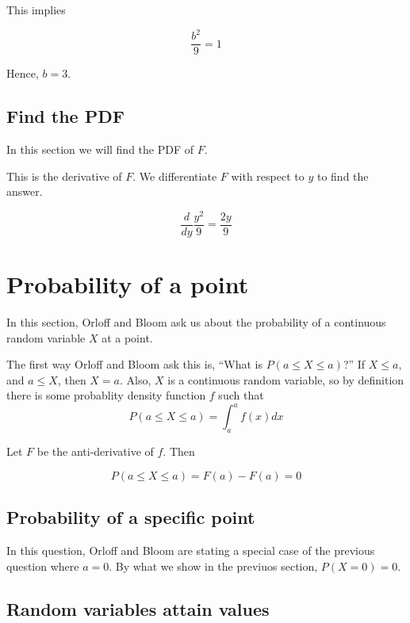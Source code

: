 \documentclass[a4paper,11pt]{article}
\begin{document}
This implies


\begin{equation}
  \frac{b^{2}}{9} = 1
\end{equation}

Hence, $b = 3$.

\subsection{Find the PDF}

In this section we will find the PDF of $F$.

This is the derivative of $F$.  We differentiate $F$ with respect to $y$ to
find the answer.

\begin{equation}
  \frac{d}{dy} \frac{y^2}{9} = \frac{2 y}{9}
\end{equation}

\section{Probability of a point}
In this section, Orloff and Bloom ask us about the probability of a
continuous random variable $X$ at a point.

The first way Orloff and Bloom ask this is,
``What is $P \left( a \leq X \leq a \right)$?''  If $X \leq a$, and $a \leq X$,
then $X=a$. Also, $X$ is a continuous random variable, so by definition
\cite{reading5b} there is some probablity density function $f$ such that
\begin{equation}
  P \left(a \leq X \leq a \right) = \int_{a}^{a} f\left(x \right) dx
\end{equation}

Let $F$ be the anti-derivative of $f$.  Then

\begin{equation}
  P \left(a \leq X \leq a \right) = F \left(a \right)  - F \left( a \right) = 0
\end{equation}

\subsection{ Probability of a specific point}
In this question, Orloff and Bloom are stating a special case of the previous
question where $a=0$.   By what we show in the previuos section,
$P\left(X=0 \right) = 0$.

\subsection{Random variables attain values}
\end{document}
